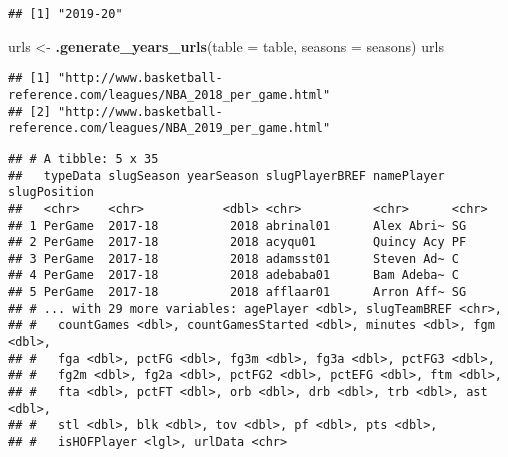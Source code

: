 \documentclass[]{article}
\newenvironment{Shaded}{\begin{snugshade}}{\end{snugshade}}
\newcommand{\KeywordTok}[1]{\textcolor[rgb]{0.13,0.29,0.53}{\textbf{#1}}}
\newcommand{\DataTypeTok}[1]{\textcolor[rgb]{0.13,0.29,0.53}{#1}}
\newcommand{\DecValTok}[1]{\textcolor[rgb]{0.00,0.00,0.81}{#1}}
\newcommand{\StringTok}[1]{\textcolor[rgb]{0.31,0.60,0.02}{#1}}
\newcommand{\ControlFlowTok}[1]{\textcolor[rgb]{0.13,0.29,0.53}{\textbf{#1}}}
\newcommand{\OperatorTok}[1]{\textcolor[rgb]{0.81,0.36,0.00}{\textbf{#1}}}
\newcommand{\NormalTok}[1]{#1}
\begin{document}
\begin{verbatim}
## [1] "2019-20"
\end{verbatim}

\begin{Shaded}
\begin{Highlighting}[]
\NormalTok{urls <-}
\StringTok{  }\KeywordTok{.generate_years_urls}\NormalTok{(}\DataTypeTok{table =}\NormalTok{ table, }\DataTypeTok{seasons =}\NormalTok{ seasons)}
\NormalTok{urls}
\end{Highlighting}
\end{Shaded}

\begin{verbatim}
## [1] "http://www.basketball-reference.com/leagues/NBA_2018_per_game.html"
## [2] "http://www.basketball-reference.com/leagues/NBA_2019_per_game.html"
\end{verbatim}

\begin{Shaded}
\end{Shaded}

\begin{verbatim}
## # A tibble: 5 x 35
##   typeData slugSeason yearSeason slugPlayerBREF namePlayer slugPosition
##   <chr>    <chr>           <dbl> <chr>          <chr>      <chr>       
## 1 PerGame  2017-18          2018 abrinal01      Alex Abri~ SG          
## 2 PerGame  2017-18          2018 acyqu01        Quincy Acy PF          
## 3 PerGame  2017-18          2018 adamsst01      Steven Ad~ C           
## 4 PerGame  2017-18          2018 adebaba01      Bam Adeba~ C           
## 5 PerGame  2017-18          2018 afflaar01      Arron Aff~ SG          
## # ... with 29 more variables: agePlayer <dbl>, slugTeamBREF <chr>,
## #   countGames <dbl>, countGamesStarted <dbl>, minutes <dbl>, fgm <dbl>,
## #   fga <dbl>, pctFG <dbl>, fg3m <dbl>, fg3a <dbl>, pctFG3 <dbl>,
## #   fg2m <dbl>, fg2a <dbl>, pctFG2 <dbl>, pctEFG <dbl>, ftm <dbl>,
## #   fta <dbl>, pctFT <dbl>, orb <dbl>, drb <dbl>, trb <dbl>, ast <dbl>,
## #   stl <dbl>, blk <dbl>, tov <dbl>, pf <dbl>, pts <dbl>,
## #   isHOFPlayer <lgl>, urlData <chr>
\end{verbatim}
\end{document}
